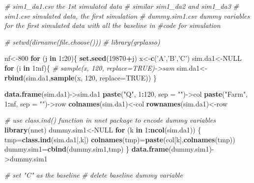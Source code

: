 \documentclass[
]{article}
\newenvironment{Shaded}{\begin{snugshade}}{\end{snugshade}}
\newcommand{\CommentTok}[1]{\textcolor[rgb]{0.56,0.35,0.01}{\textit{#1}}}
\newcommand{\ControlFlowTok}[1]{\textcolor[rgb]{0.13,0.29,0.53}{\textbf{#1}}}
\newcommand{\DataTypeTok}[1]{\textcolor[rgb]{0.13,0.29,0.53}{#1}}
\newcommand{\DecValTok}[1]{\textcolor[rgb]{0.00,0.00,0.81}{#1}}
\newcommand{\KeywordTok}[1]{\textcolor[rgb]{0.13,0.29,0.53}{\textbf{#1}}}
\newcommand{\NormalTok}[1]{#1}
\newcommand{\OperatorTok}[1]{\textcolor[rgb]{0.81,0.36,0.00}{\textbf{#1}}}
\newcommand{\OtherTok}[1]{\textcolor[rgb]{0.56,0.35,0.01}{#1}}
\newcommand{\StringTok}[1]{\textcolor[rgb]{0.31,0.60,0.02}{#1}}
\begin{document}
\begin{Shaded}
\begin{Highlighting}[]
\CommentTok{# sim1_da1.csv  the 1st simulated data}
\CommentTok{# similar sim1_da2 and sim1_da3}
\CommentTok{# sim1.csv  simulated data, the first simulation}
\CommentTok{# dummy.sim1.csv dummy variables for the first simulated data with all the baseline in}
\CommentTok{#code for simulation}

\CommentTok{# setwd(dirname(file.choose()))}
\CommentTok{# library(grplasso)}

\NormalTok{nf<-}\DecValTok{800}
\ControlFlowTok{for}\NormalTok{ (j }\ControlFlowTok{in} \DecValTok{1}\OperatorTok{:}\DecValTok{20}\NormalTok{)\{}
\KeywordTok{set.seed}\NormalTok{(}\DecValTok{19870}\OperatorTok{+}\NormalTok{j)}
\NormalTok{x<-}\KeywordTok{c}\NormalTok{(}\StringTok{'A'}\NormalTok{,}\StringTok{'B'}\NormalTok{,}\StringTok{'C'}\NormalTok{)}
\NormalTok{sim.da1<-}\OtherTok{NULL}
\ControlFlowTok{for}\NormalTok{ (i }\ControlFlowTok{in} \DecValTok{1}\OperatorTok{:}\NormalTok{nf)\{}
\CommentTok{# sample(x, 120, replace=TRUE)->sam}
\NormalTok{sim.da1<-}\KeywordTok{rbind}\NormalTok{(sim.da1,}\KeywordTok{sample}\NormalTok{(x, }\DecValTok{120}\NormalTok{, }\DataTypeTok{replace=}\OtherTok{TRUE}\NormalTok{))}
\NormalTok{\}}

\KeywordTok{data.frame}\NormalTok{(sim.da1)->sim.da1}
\KeywordTok{paste}\NormalTok{(}\StringTok{"Q"}\NormalTok{, }\DecValTok{1}\OperatorTok{:}\DecValTok{120}\NormalTok{, }\DataTypeTok{sep =} \StringTok{""}\NormalTok{)->col}
\KeywordTok{paste}\NormalTok{(}\StringTok{"Farm"}\NormalTok{, }\DecValTok{1}\OperatorTok{:}\NormalTok{nf, }\DataTypeTok{sep =} \StringTok{""}\NormalTok{)->row}
\KeywordTok{colnames}\NormalTok{(sim.da1)<-col}
\KeywordTok{rownames}\NormalTok{(sim.da1)<-row}

\CommentTok{# use class.ind() function in nnet package to encode dummy variables}
\KeywordTok{library}\NormalTok{(nnet)}
\NormalTok{dummy.sim1<-}\OtherTok{NULL}
\ControlFlowTok{for}\NormalTok{ (k }\ControlFlowTok{in} \DecValTok{1}\OperatorTok{:}\KeywordTok{ncol}\NormalTok{(sim.da1)) \{}
\NormalTok{tmp=}\KeywordTok{class.ind}\NormalTok{(sim.da1[,k])}
\KeywordTok{colnames}\NormalTok{(tmp)=}\KeywordTok{paste}\NormalTok{(col[k],}\KeywordTok{colnames}\NormalTok{(tmp))}
\NormalTok{dummy.sim1=}\KeywordTok{cbind}\NormalTok{(dummy.sim1,tmp)}
\NormalTok{\}}
\KeywordTok{data.frame}\NormalTok{(dummy.sim1)->dummy.sim1}

\CommentTok{# set "C" as the baseline}
\CommentTok{# delete baseline dummy variable}


\end{Highlighting}
\end{Shaded}
\end{document}
